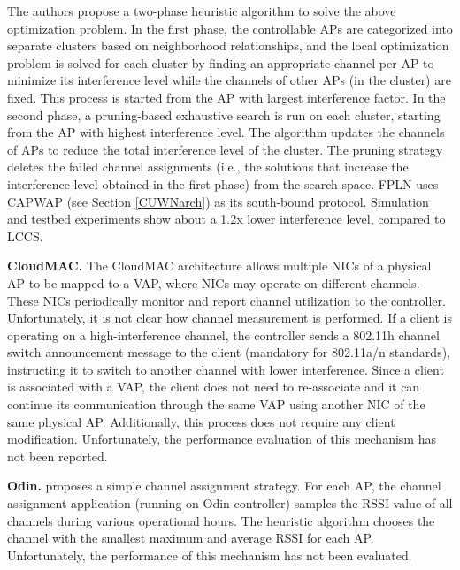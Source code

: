The authors propose a two-phase heuristic algorithm to solve the above optimization problem. 
In the first phase, the controllable APs are categorized into separate clusters based on neighborhood relationships, and the local optimization problem is solved for each cluster by finding an appropriate channel per AP to minimize its interference level while the channels of other APs (in the cluster) are fixed. 
This process is started from the AP with largest interference factor. 
In the second phase, a pruning-based exhaustive search is run on each cluster, starting from the AP with highest interference level. 
The algorithm updates the channels of APs to reduce the total interference level of the cluster. 
The pruning strategy deletes the failed channel assignments (i.e., the solutions that increase the interference level obtained in the first phase) from the search space.
FPLN uses CAPWAP (see Section \ref{CUWNarch}) as its south-bound protocol. 
Simulation and testbed experiments show about a 1.2x lower interference level, compared to LCCS.


\textbf{CloudMAC.}
\label{CloudMAC_CM}
The CloudMAC \cite{CloudMAC,CloudMAC3} architecture allows multiple NICs of a physical AP to be mapped to a VAP, where NICs may operate on different channels. 
These NICs  periodically monitor and report channel utilization to the controller. 
Unfortunately, it is not clear how channel measurement is performed.
If a client is operating on a high-interference channel, the controller sends a 802.11h channel switch announcement message to the client (mandatory for 802.11a/n standards), instructing it to switch to another channel with lower interference. 
Since a client is associated with a VAP, the client does not need to re-associate and it can continue its communication through the same VAP using another NIC of the same physical AP.
Additionally, this process does not require any client modification.
Unfortunately, the performance evaluation of this mechanism has not been reported.



\label{Odin-CM}
\textbf{Odin.}
\cite{Odin2} proposes a simple channel assignment strategy. 
For each AP, the channel assignment application (running on Odin controller) samples the RSSI value of all channels during various operational hours.
The heuristic algorithm chooses the channel with the smallest maximum and average RSSI for each AP.
Unfortunately, the performance of this mechanism has not been evaluated.


